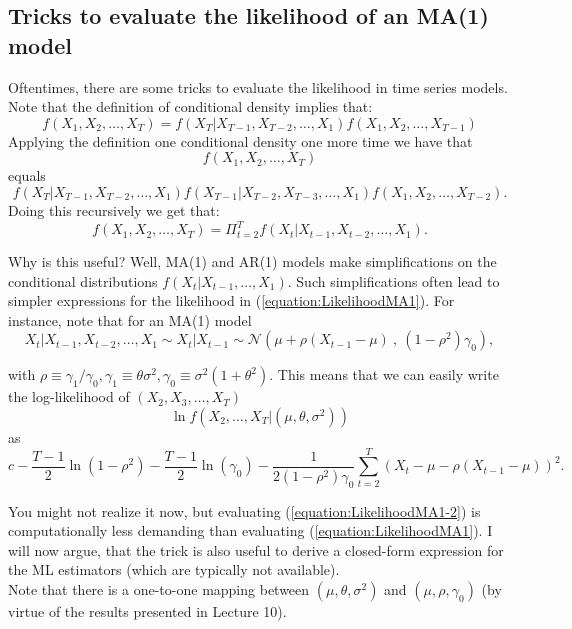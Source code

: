 \documentclass[12] {article}
\begin{document}
\subsection{Tricks to evaluate the likelihood of an MA(1) model}

Oftentimes, there are some tricks to evaluate the likelihood in time series models. Note that the definition of conditional density  implies that:
$$ f(X_1, X_2, \ldots, X_T)  = f(X_T | X_{T-1}, X_{T-2}, \ldots, X_{1}) f(X_{1}, X_{2}, \ldots, X_{T-1}) $$ 
Applying the definition one conditional density one more time we have that
$$ f(X_{1}, X_{2}, \ldots, X_{T})$$
equals
$$f(X_T | X_{T-1}, X_{T-2}, \ldots, X_{1}) f(X_{T-1} | X_{T-2}, X_{T-3}, \ldots, X_{1}) f(X_{1}, X_{2}, \ldots, X_{T-2}).$$
\noindent Doing this recursively we get that:
$$ f(X_1, X_2, \ldots, X_{T}) = \Pi_{t=2}^{T} f(X_t | X_{t-1}, X_{t-2}, \ldots, X_{1}).$$

\noindent Why is this useful? Well, MA(1) and AR(1) models make simplifications on the conditional distributions $f(X_t | X_{t-1}, \ldots, X_{1})$. Such simplifications often lead to simpler expressions for the likelihood in (\ref{equation:LikelihoodMA1}). For instance, note that for an MA(1) model
$$ X_{t} | X_{t-1}, X_{t-2}, \ldots, X_1  \sim X_{t} | X_{t-1} \sim \mathcal{N}( \mu + \rho(X_{t-1}-\mu) \: , \: (1-\rho^2) \gamma_0 ),$$

\noindent with $\rho \equiv \gamma_1 / \gamma_0, \gamma_1 \equiv \theta \sigma^2, \gamma_0 \equiv \sigma^2(1+ \theta^2)$. This means that we can easily write the log-likelihood of $(X_2, X_3, \ldots, X_{T})$
$$\ln f(X_2, \ldots, X_{T} | (\mu, \theta, \sigma^2))$$
as 
\begin{equation} \label{equation:LikelihoodMA1-2}
c - \frac{T-1}{2} \ln (1-\rho^2) - \frac{T-1}{2} \ln (\gamma_0) - \frac{1}{2 (1-\rho^2) \gamma_0 } \sum_{t=2}^{T} (X_t - \mu - \rho (X_{t-1}-\mu))^2. 
\end{equation}

\noindent You might not realize it now, but evaluating (\ref{equation:LikelihoodMA1-2}) is computationally less demanding than evaluating (\ref{equation:LikelihoodMA1}). I will now argue, that the trick is also useful to derive a closed-form expression for the ML estimators (which are typically not available). \\

\noindent Note that there is a one-to-one mapping between $(\mu, \theta, \sigma^2)$ and $(\mu, \rho, \gamma_0)$ (by virtue of the results presented in Lecture 10). 
\end{document}
